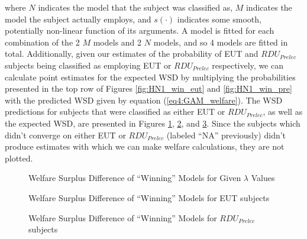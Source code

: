 \documentclass[../main.tex]{subfiles}
\begin{document}
\noindent where $N$ indicates the model that the subject was classified as, $M$ indicates the model the subject actually employs, and $s(\cdot)$ indicates some smooth, potentially non-linear function of its arguments.
A model is fitted for each combination of the 2 $M$ models and 2 $N$ models, and so 4 models are fitted in total.
Additionally, given our estimates of the probability of EUT and $\mathit{RDU_{Prelec}}$ subjects being classified as employing EUT or $\mathit{RDU_{Prelec}}$ respectively, we can calculate point estimates for the expected WSD by multiplying the probabilities presented in the top row of Figures \ref{fig:HN1_win_eut} and \ref{fig:HN1_win_pre} with the predicted WSD given by equation (\ref{eq4:GAM_welfare}).
The WSD predictions for subjects that were classified as either EUT or $\mathit{RDU_{Prelec}}$, as well as the expected WSD, are presented in Figures \ref{fig:HN1_wel_mu}, \ref{fig:HN1_wel_eut}, and \ref{fig:HN1_wel_pre}.
Since the subjects which didn't converge on either EUT or $\mathit{RDU_{Prelec}}$ (labeled \enquote{NA} previously) didn't produce estimates with which we can make welfare calculations, they are not plotted.

\begin{figure}[ht!]
	\center
	\caption{Welfare Surplus Difference of \enquote{Winning} Models for Given $\lambda$ Values}
	\label{fig:HN1_wel_mu}
\end{figure}

\begin{figure}[hb!]
	\center
	\caption{Welfare Surplus Difference of \enquote{Winning} Models for EUT subjects}
	\label{fig:HN1_wel_eut}
\end{figure}

\begin{figure}[ht!]
	\center
	\caption{Welfare Surplus Difference of \enquote{Winning} Models for $\mathit{RDU_{Prelec}}$ subjects}
	\label{fig:HN1_wel_pre}
\end{figure}
\end{document}
